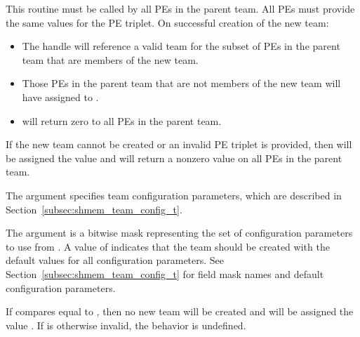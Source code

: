 \begin{apidefinition}
{This routine must be called by all \acp{PE} in the parent team.
All \acp{PE} must provide the same values for the \ac{PE} triplet.
On successful creation of the new team:

\begin{itemize}
\item The  handle will reference a valid team for the
  subset of \acp{PE} in the parent team that are members of the new team.
\item Those \acp{PE} in the parent team that are not members of the new team
  will have  assigned to .
\item {} will return zero to all
  \acp{PE} in the parent team.
\end{itemize}

If the new team cannot be created or an invalid \ac{PE} triplet is provided,
then  will be assigned the value  and
 will return a nonzero value on all
\acp{PE} in the parent team.

The  argument specifies team configuration parameters, which are
described in Section~\ref{subsec:shmem_team_config_t}.

The  argument is a bitwise mask representing the set of
configuration parameters to use from .
A  value of  indicates that the team
should be created with the default values for all configuration parameters.
See Section~\ref{subsec:shmem_team_config_t} for field mask names and
default configuration parameters.

If 
compares equal to , then no new team
will be created and  will be assigned the value
.  If  is otherwise invalid, the behavior is undefined.
}




\end{apidefinition}
